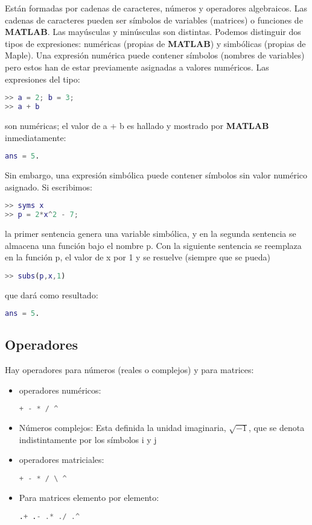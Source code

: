 Están formadas por cadenas de caracteres, números y operadores algebraicos. Las cadenas de caracteres pueden ser símbolos
de variables (matrices) o funciones de \textbf{MATLAB}. Las mayúsculas y minúsculas son distintas. Podemos distinguir dos
tipos de expresiones: numéricas (propias de \textbf{MATLAB}) y simbólicas (propias de Maple). Una expresión numérica puede
contener símbolos (nombres de variables) pero estos han de estar previamente asignadas a valores numéricos. Las expresiones
del tipo:
\begin{lstlisting}[language=Matlab]
>> a = 2; b = 3;
>> a + b
\end{lstlisting}

son numéricas; el valor de a + b es hallado y mostrado por \textbf{MATLAB} inmediatamente:
\begin{lstlisting}[language=Matlab]
ans = 5. 
\end{lstlisting}

Sin embargo, una expresión simbólica puede contener símbolos sin valor numérico asignado. Si escribimos:
\begin{lstlisting}[language=Matlab]
>> syms x
>> p = 2*x^2 - 7;
\end{lstlisting}

la primer sentencia genera una variable simbólica, y en la segunda sentencia se almacena una función bajo el nombre p. Con la siguiente sentencia se reemplaza en la función p, el valor de  x por 1 y se resuelve (siempre que se pueda)
\begin{lstlisting}[language=Matlab]
>> subs(p,x,1)
\end{lstlisting}

que dará como resultado:
\begin{lstlisting}[language=Matlab]
ans = 5.
\end{lstlisting}

\subsection{Operadores}

Hay operadores para números (reales o complejos) y para matrices:
\begin{itemize}
\item operadores numéricos: 
\begin{lstlisting}[language=Matlab]
+ - * / ^
\end{lstlisting}
\item Números complejos: Esta definida la unidad imaginaria, $\sqrt{-1}$, que se denota indistintamente por los símbolos i y j
\item operadores matriciales:
\begin{lstlisting}[language=Matlab]
 + - * / \ ^
\end{lstlisting}
\item Para matrices elemento por elemento: 
\begin{lstlisting}[language=Matlab]
.+ .- .* ./ .^
\end{lstlisting}
\end{itemize} 

